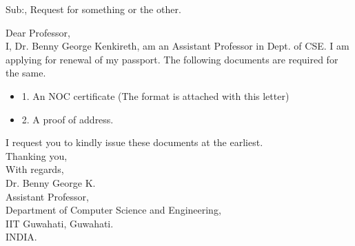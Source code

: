 \def\DevnagVersion{2.15}\documentclass[12pt]{article}
\begin{document}
\begin{center}
{   Sub:, Request for something or the other.} \\  
\end{center}
Dear Professor,\\
I, Dr. Benny George Kenkireth, am an Assistant Professor in Dept. of CSE.
I am applying for renewal of my passport. The following documents are required for the same.
\begin{itemize}
\item 1. An NOC certificate (The format is attached with this letter)
\item 2. A proof of address.
\end{itemize}
I request you to kindly issue these documents at the earliest.\\
Thanking you,\\
\medskip
With regards, ~~~~~~~~~~\\[15mm]
Dr. Benny George K. \\
Assistant Professor, \\
Department of Computer Science and Engineering,\\
IIT Guwahati,
Guwahati. \\
INDIA.
\end{document}
